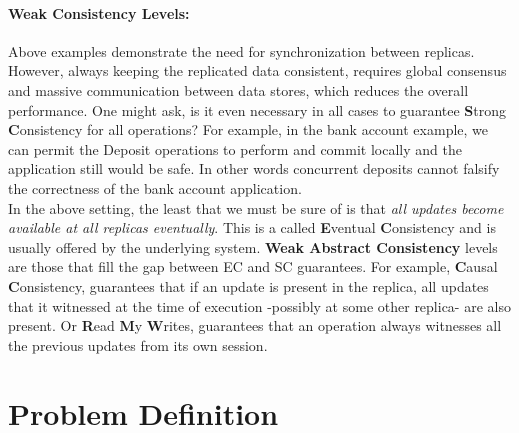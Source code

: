 \documentclass[runningheads]{llncs}
\begin{document}
\paragraph {\bf Weak Consistency Levels:}
Above examples demonstrate the need for synchronization between replicas. However, always keeping the replicated data consistent, requires global consensus and massive communication between data stores, which reduces the overall performance. One might ask, is it even necessary in all cases to guarantee {\bf S}trong {\bf C}onsistency for all operations? For example, in the bank account example, we can permit the Deposit operations to perform and commit locally and the application still would be safe. In other words concurrent deposits cannot falsify the correctness of the bank account application. 
\\ In the above setting, the least that we must be sure of is that \emph{all updates become available at all replicas eventually}. This is a called {\bf E}ventual {\bf C}onsistency and is usually offered by the underlying system. {\bf Weak Abstract Consistency} levels are those that fill the gap between EC and SC guarantees.
For example, {\bf C}ausal {\bf C}onsistency, guarantees that if an update is present in the replica, all updates that it witnessed at the time of execution -possibly at some other replica- are also present. Or {\bf R}ead {\bf M}y {\bf W}rites, guarantees that an operation always witnesses all the previous updates from its own session. 
 

\section{Problem Definition}
\end{document}
